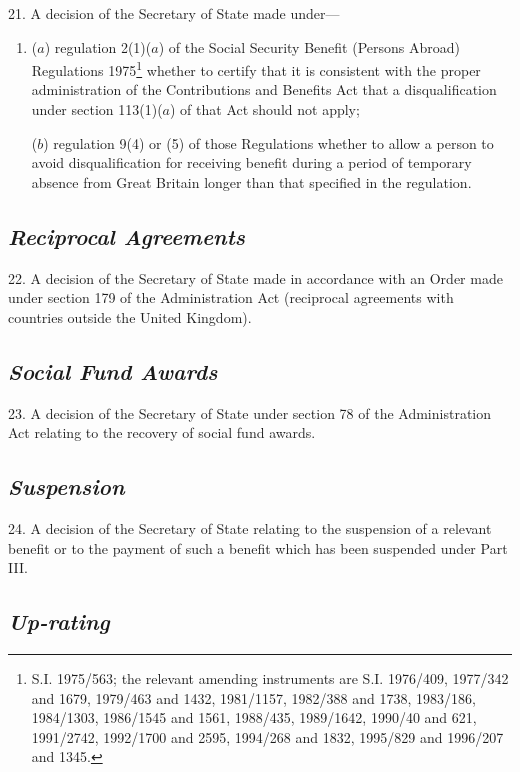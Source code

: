 \documentclass[12pt,a4paper]{article}
\begin{document}
21.  A decision of the Secretary of State made under—
\begin{enumerate}\item[]
($a$) regulation 2(1)($a$) of the Social Security Benefit (Persons Abroad) Regulations 1975\footnote{\frenchspacing S.I. 1975/563; the relevant amending instruments are S.I. 1976/409, 1977/342 and 1679, 1979/463 and 1432, 1981/1157, 1982/388 and 1738, 1983/186, 1984/1303, 1986/1545 and 1561, 1988/435, 1989/1642, 1990/40 and 621, 1991/2742, 1992/1700 and 2595, 1994/268 and 1832, 1995/829 and 1996/207 and 1345.} whether to certify that it is consistent with the proper administration of the Contributions and Benefits Act that a disqualification under section 113(1)($a$) of that Act should not apply;

($b$) regulation 9(4) or (5) of those Regulations whether to allow a person to avoid disqualification for receiving benefit during a period of temporary absence from Great Britain longer than that specified in the regulation.
\end{enumerate}

\subsection*{\itshape Reciprocal Agreements}

22.  A decision of the Secretary of State made in accordance with an Order made under section 179 of the Administration Act (reciprocal agreements with countries outside the United Kingdom).

\subsection*{\itshape Social Fund Awards}

23.  A decision of the Secretary of State under section 78 of the Administration Act relating to the recovery of social fund awards.

\subsection*{\itshape Suspension}

24.  A decision of the Secretary of State relating to the suspension of a relevant benefit or to the payment of such a benefit which has been suspended under Part III.

\subsection*{\itshape Up-rating}
\end{document}
